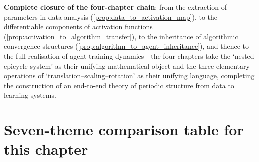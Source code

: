 \begin{remark}
\textbf{Complete closure of the four-chapter chain}: from the extraction of parameters in data analysis (\cref{prop:data_to_activation_map}), to the differentiable components of activation functions (\cref{prop:activation_to_algorithm_transfer}), to the inheritance of algorithmic convergence structures (\cref{prop:algorithm_to_agent_inheritance}), and thence to the full realisation of agent training dynamics---the four chapters take the `nested epicycle system' as their unifying mathematical object and the three elementary operations of `translation--scaling--rotation' as their unifying language, completing the construction of an end-to-end theory of periodic structure from data to learning systems.
\end{remark}

\section*{Seven-theme comparison table for this chapter}

